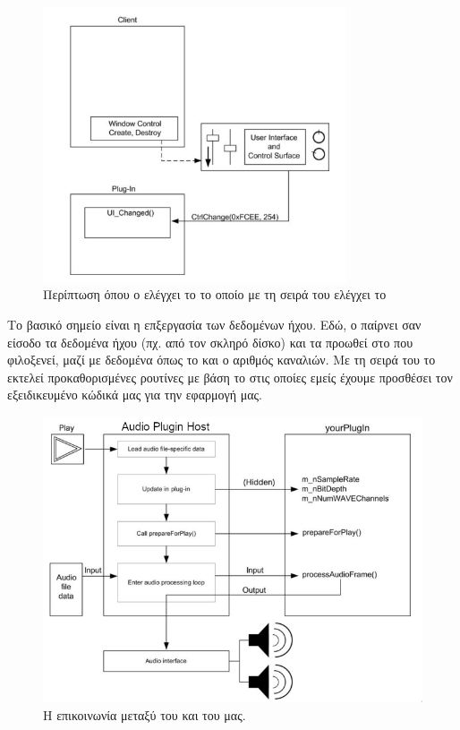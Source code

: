 \documentclass[12pt]{extarticle}
\begin{document}
\begin{figure}[!htb]
    \centering
    \includegraphics[width=0.8\textwidth]{./assets/plugin_client.png}
    \caption{Περίπτωση όπου ο  ελέγχει το  το οποίο με τη σειρά του ελέγχει το }
    \label{fig:}
\end{figure}

Το βασικό σημείο είναι η επξεργασία των δεδομένων ήχου. Εδώ, 
ο  παίρνει σαν είσοδο τα δεδομένα ήχου (πχ. από τον σκληρό δίσκο) 
και τα προωθεί στο  που φιλοξενεί, μαζί με δεδομένα όπως 
το  και ο αριθμός καναλιών.
Με τη σειρά του το  εκτελεί προκαθορισμένες ρουτίνες με βάση το 
στις οποίες εμείς έχουμε προσθέσει τον εξειδικευμένο κώδικά μας για την εφαρμογή μας.

\begin{figure}[htpb]
    \centering
    \includegraphics[width=\textwidth]{./assets/events.png}
    \caption{Η επικοινωνία μεταξύ του  και του  μας.}
\end{figure}
\end{document}
